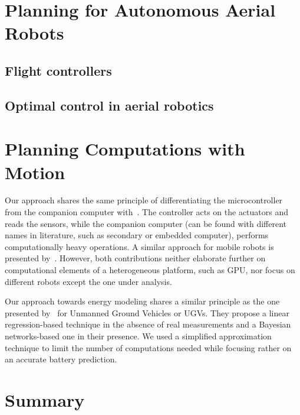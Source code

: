 \section{\color{orange}Planning for Autonomous Aerial Robots}
\label{sec:soa-aerial-pl}

\subsection{\color{orange}Flight controllers}



\subsection{\color{orange}Optimal control in aerial robotics}


\section{\color{cyan}Planning Computations with Motion}
\label{sec:soa-comp-motion-pl}


Our approach shares the same principle of differentiating the microcontroller from the companion computer with~\citep{mei2004energy, mei2005case}. The controller acts on the actuators and reads the sensors, while the companion computer (can be found with different names in literature, such as secondary or embedded computer), performs computationally heavy operations. A similar approach for mobile robots is presented by~\citep{dressler2005energy}. However, both contributions neither elaborate further on computational elements of a heterogeneous platform, such as GPU, nor focus on different robots except the one under analysis.

Our approach towards energy modeling shares a similar principle as the one presented by~\citep{sadrpour2013mission, sadrpour2013experimental} for Unmanned Ground Vehicles or UGVs. They propose a linear regression-based technique in the absence of real measurements and a Bayesian networks-based one in their presence. We used a simplified approximation technique to limit the number of computations needed while focusing rather on an accurate battery prediction.

\section{\color{red}Summary}

